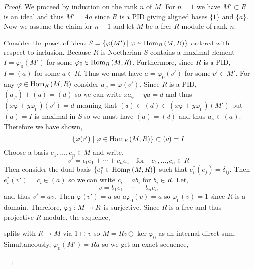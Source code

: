 \documentclass[12pt]{article}
\begin{document}
\begin{proof}
We proceed by induction on the rank $n$ of $M$. For $n = 1$ we have $M' \subset R$ is an ideal and thus $M' = A a$ since $R$ is a PID giving aligned bases $\{ 1 \}$ and $\{ a \}$. Now we assume the claim for $n-1$ and let $M$ be a free $R$-module of rank $n$.

Consider the poset of ideas $S = \{ \varphi(M') \mid \varphi \in \mathrm{Hom}_{R} \left( M, R \right) \}$ ordered with respect to inclusion. Because $R$ is Noetherian $S$ contains a maximal element $I = \varphi_0(M')$ for some $\varphi_0 \in \mathrm{Hom}_{R} \left( M, R \right)$. Furthermore, since $R$ is a PID, $I = (a)$ for some $a \in R$. Thus we must have $a = \varphi_0(v')$ for some $v' \in M'$. For any $\varphi \in \mathrm{Hom}_{R} \left( M, R \right)$ consider $a_\varphi = \varphi(v')$. Since $R$ is a PID, $(a_\varphi) + (a) = (d)$ so we can write $x a_\varphi + y a = d$ and thus $( x \varphi + y \varphi_0)(v') = d$ meaning that $(a) \subset (d) \subset (x \varphi + y \varphi_0)(M')$ but $(a) = I$ is maximal in $S$ so we must have $(a) = (d)$ and thus $a_\varphi \in (a)$. Therefore we have shown,
\[ \{ \varphi(v') \mid \varphi \in \mathrm{Hom}_{R} \left( M, R \right) \} \subset (a) = I  \]
Choose a basis $e_1, \dots, e_{n} \in M$ and write,
\[ v' = c_1 e_1 + \cdots + c_n e_n \quad \text{for} \quad c_1, \dots, c_n \in R \]
Then consider the dual basis $\{ e_i^* \in \mathrm{Hom}_{R} \left( M, R \right) \}$ such that $e_i^*(e_j) = \delta_{ij}$. Then $e_i^*(v') = c_i \in (a)$ so we can write $c_i = a b_i$ for $b_i \in R$. Let,
\[ v = b_1 e_1 + \cdots + b_n e_n \]
and thus $v' = a v$. Then $\varphi(v') = a$ so $a \varphi_0(v) = a$ so $\varphi_0(v) = 1$ since $R$ is a domain. Therefore, $\varphi_0 : M \twoheadrightarrow R$ is surjective. Since $R$ is a free and thus projective $R$-module, the sequence,
\begin{center}
\end{center}
splits with $R \to M$ via $1 \mapsto v$ so $M = R v \oplus \ker{\varphi_0}$ as an internal direct sum. Simultaneously, $\varphi_0(M') = R a$ so we get an exact sequence,
\begin{center}
\end{center}
\end{proof}
\end{document}
